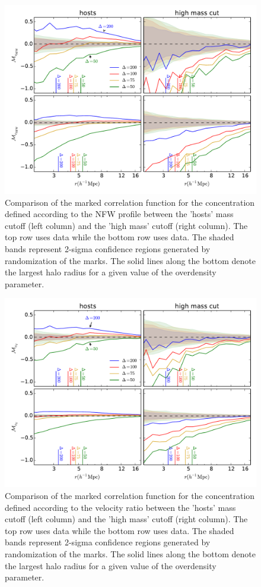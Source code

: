 \documentclass[usenatbib,usegraphicx,letterpaper]{mn2e}
\begin{document}
\begin{figure}
	\centering
	\includegraphics[width=\textwidth]{all_mcf_cnfw_z00_hostsvhigh.pdf}
	\caption{Comparison of the marked correlation function for the concentration defined according to the NFW profile between the 'hosts' mass cutoff (left column) and the 'high mass' cutoff (right column). The top row uses \simA data while the bottom row uses \simB data. The shaded bands represent 2-sigma confidence regions generated by randomization of the marks. The solid lines along the bottom denote the largest halo radius for a given value of the overdensity parameter.}
	\label{fig:hvh_mcf_cnfw}
\end{figure}

\begin{figure}
	\centering
	\includegraphics[width=\textwidth]{all_mcf_cV_z00_hostsvhigh.pdf}
	\caption{Comparison of the marked correlation function for the concentration defined according to the velocity ratio between the 'hosts' mass cutoff (left column) and the 'high mass' cutoff (right column). The top row uses \simA data while the bottom row uses \simB data. The shaded bands represent 2-sigma confidence regions generated by randomization of the marks. The solid lines along the bottom denote the largest halo radius for a given value of the overdensity parameter.}
	\label{fig:hvh_mcf_cV}
\end{figure}
\end{document}
